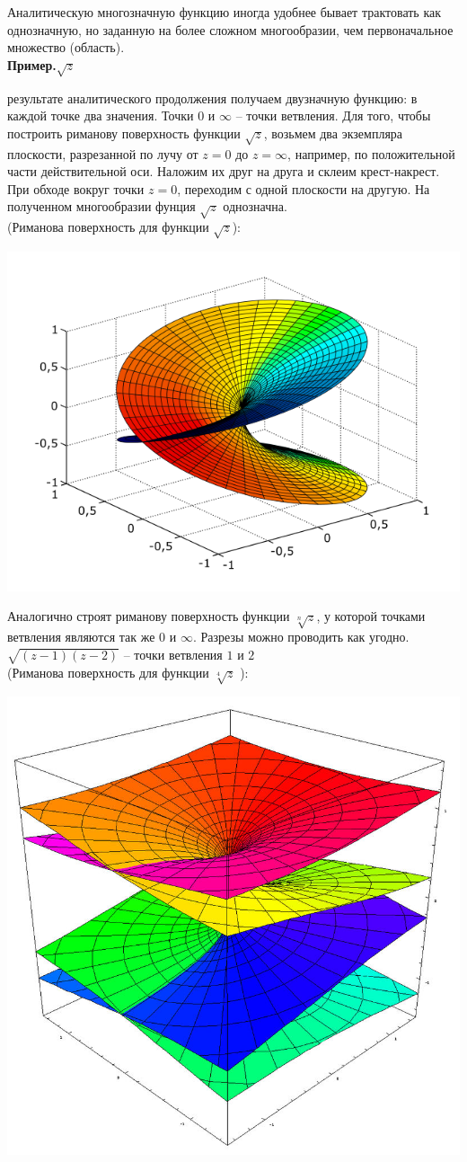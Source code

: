 \documentclass[a4paper, 12pt]{report}
\begin{document}
Аналитическую многозначную функцию иногда удобнее бывает трактовать как однозначную, но заданную на более сложном многообразии, чем первоначальное множество (область).\\


\textbf{Пример.}\quad $\sqrt{z}$ \par{} результате аналитического продолжения получаем двузначную функцию: в каждой точке два значения. Точки $0$ и $\infty$ -- точки ветвления. Для того, чтобы построить риманову поверхность функции $\sqrt{z}$, возьмем два экземпляра плоскости, разрезанной по лучу от $z = 0$ до $z = \infty$, например, по положительной части действительной оси. Наложим их друг на друга и склеим крест-накрест. При обходе вокруг точки $z = 0$, переходим с одной плоскости на другую. На полученном многообразии фунция  $\sqrt{z}$ однозначна. \\

(Риманова поверхность для функции  $\sqrt{z}$):

\includegraphics[width=9 cm]{Riemann/Riemann_sqrt.svg.png}


Аналогично строят риманову поверхность функции $\sqrt[n]{z}$, у которой точками ветвления являются так же $0$ и $\infty$. Разрезы можно проводить как угодно.\\


$\sqrt{(z-1)(z-2)}$ -- точки ветвления $1$ и $2$ \\

(Риманова поверхность для функции  $\sqrt[4]{z}$ ):

\includegraphics[width=9 cm]{Riemann/800px-Riemann_surface_4th_root.jpg}\\
\end{document}
